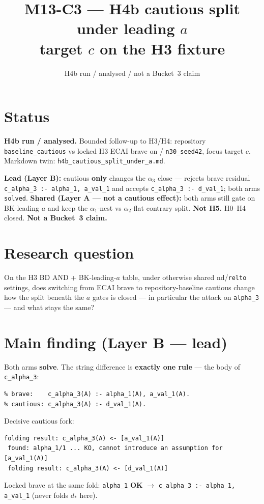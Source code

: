 \documentclass[11pt]{article}
\title{M13-C3 --- H4b cautious split under leading \(a\)\\
target \(c\) on the H3 fixture}
\author{}
\date{H4b run / analysed / not a Bucket~3 claim}
\begin{document}
\maketitle

\section{Status}

\textbf{H4b run / analysed.}
Bounded follow-up to H3/H4: repository \texttt{baseline\_cautious} vs locked
H3 ECAI brave on  /
\texttt{n30\_seed42}, focus target \(c\).
Markdown twin: \texttt{h4b\_cautious\_split\_under\_a.md}.

\textbf{Lead (Layer B):} cautious \textbf{only} changes the \(\alpha_3\) close
--- rejects brave residual \texttt{c\_alpha\_3 :- alpha\_1, a\_val\_1} and
accepts \texttt{c\_alpha\_3 :- d\_val\_1}; both arms \texttt{solved}.
\textbf{Shared (Layer A --- not a cautious effect):} both arms still gate on
BK-leading \(a\) and keep the \(\alpha_1\)-nest vs \(\alpha_2\)-flat contrary
split.
\textbf{Not H5.} H0--H4 closed. \textbf{Not a Bucket~3 claim.}

\section{Research question}

On the H3 BD AND + BK-leading-\(a\) table, under otherwise shared nd/\texttt{relto}
settings, does switching from ECAI brave to repository-baseline cautious change
how the split beneath the \(a\) gates is closed --- in particular the attack on
\texttt{alpha\_3} --- and what stays the same?

\section{Main finding (Layer B --- lead)}

Both arms \textbf{solve}.
The string difference is \textbf{exactly one rule} --- the body of
\texttt{c\_alpha\_3}:
\begin{verbatim}
% brave:    c_alpha_3(A) :- alpha_1(A), a_val_1(A).
% cautious: c_alpha_3(A) :- d_val_1(A).
\end{verbatim}

Decisive cautious fork:
\begin{verbatim}
folding result: c_alpha_3(A) <- [a_val_1(A)]
 found: alpha_1/1 ... KO, cannot introduce an assumption for [a_val_1(A)]
 folding result: c_alpha_3(A) <- [d_val_1(A)]
\end{verbatim}
Locked brave at the same fold: \texttt{alpha\_1} \textbf{OK} \(\to\)
\texttt{c\_alpha\_3 :- alpha\_1, a\_val\_1} (never folds \(d_*\) here).
\end{document}
